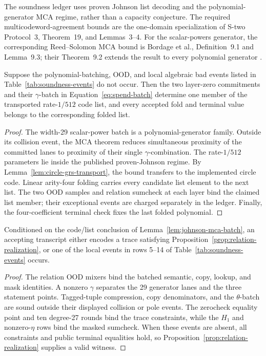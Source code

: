 The soundness ledger uses proven Johnson list decoding and the
polynomial-generator MCA regime, rather than a capacity conjecture.  The
required multicodeword-agreement bounds are the one-domain specialization of
S-two Protocol~3, Theorem~19, and Lemmas~3--4.  For the scalar-powers
generator, the corresponding Reed--Solomon MCA bound is Bordage et al.,
Definition~9.1 and Lemma~9.3; their Theorem~9.2 extends the result to every
polynomial generator
\cite{CarmonEtAl2026Stwo,BordageChiesaGuanManzur2025,Haboeck2025MCA}.

\begin{lemma}
\label{lem:johnson-mca-batch}
Suppose the polynomial-batching, OOD, and local algebraic bad events listed in
Table~\ref{tab:soundness-events} do not occur.  Then the two layer-zero
commitments and their \(\gamma\)-batch in
Equation~\eqref{eq:spend-batch} determine one member of the transported
rate-\(1/512\) code list, and every accepted fold and terminal value belongs
to the corresponding folded list.
\end{lemma}

\begin{proof}
The width-29 scalar-power batch is a polynomial-generator family.  Outside
its collision event, the MCA theorem reduces simultaneous proximity of the
committed lanes to proximity of their single \(\gamma\)-combination.  The
rate-\(1/512\) parameters lie inside the published proven-Johnson regime.  By
Lemma~\ref{lem:circle-grs-transport}, the bound transfers to the implemented
circle code.  Linear arity-four folding carries every candidate list element
to the next list.  The two OOD samples and relation sumcheck at each layer
bind the claimed list member; their exceptional events are charged
separately in the ledger.  Finally, the four-coefficient terminal check fixes
the last folded polynomial.
\end{proof}

\begin{lemma}
\label{lem:local-algebraic-binding}
Conditioned on the code/list conclusion of
Lemma~\ref{lem:johnson-mca-batch}, an accepting transcript either encodes a
trace satisfying Proposition~\ref{prop:relation-realization}, or one of the
local events in rows 5--14 of Table~\ref{tab:soundness-events} occurs.
\end{lemma}

\begin{proof}
The relation OOD mixers bind the batched semantic, copy, lookup, and mask
identities.  A nonzero \(\gamma\) separates the 29 generator lanes and the
three statement points.  Tagged-tuple compression, copy denominators, and the
\(\theta\)-batch are sound outside their displayed collision or pole events.
The zerocheck equality point and ten degree-27 rounds bind the trace
constraints, while the \(H_1\) and nonzero-\(\eta\) rows bind the masked
sumcheck.  When these events are absent, all constraints and public terminal
equalities hold, so Proposition~\ref{prop:relation-realization} supplies a
valid witness.
\end{proof}

